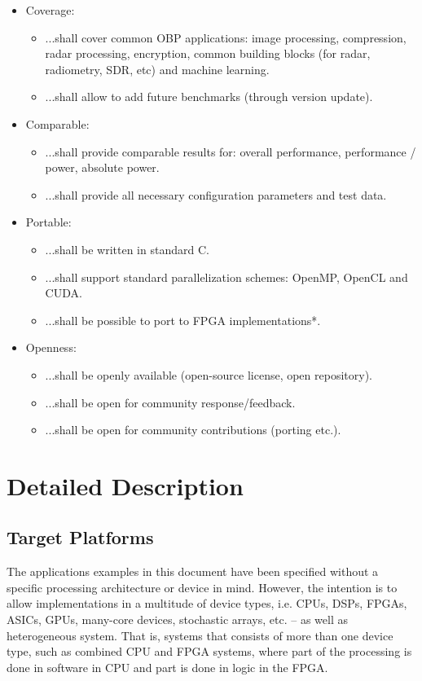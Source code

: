 \begin{itemize}
    \item Coverage:
    \begin{itemize}
        \item[] ...shall cover common OBP applications: image processing, compression, radar processing, encryption, common building blocks (for radar, radiometry, SDR, etc) and machine learning.
        \item[] ...shall allow to add future benchmarks (through version update).
    \end{itemize}
    
    \item Comparable:
    \begin{itemize}
        \item[] ...shall provide comparable results for: overall performance, performance / power, absolute power. 
        \item[] ...shall provide all necessary configuration parameters and test data.
    \end{itemize}
    
    \item Portable:
    \begin{itemize}
        \item[] ...shall be written in standard C. 
        \item[] ...shall support standard parallelization schemes: OpenMP, OpenCL and CUDA.
        \item[] ...shall be possible to port to FPGA implementations*.
    \end{itemize}
    
    \item Openness:
    \begin{itemize}
        \item[] ...shall be openly available (open-source license, open repository).
        \item[] ...shall be open for community response/feedback.
        \item[] ...shall be open for community contributions (porting etc.).
    \end{itemize}
\end{itemize}

\section{Detailed Description}
\subsection{Target Platforms}
The applications examples in this document have been specified without a specific processing architecture or device in mind. However, the intention is to allow implementations in a multitude of device types, i.e. CPUs, DSPs, FPGAs, ASICs, GPUs, many-core devices, stochastic arrays, etc. – as well as heterogeneous system. That is, systems that consists of more than one device type, such as combined CPU and FPGA systems, where part of the processing is done in software in CPU and part is done in logic in the FPGA. 

